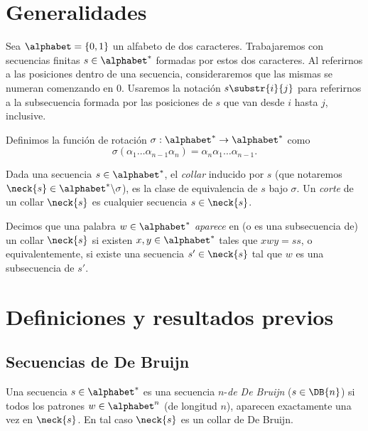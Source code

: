 
\newcommand{\note}[1]{\textbf{\textcolor{red}{#1}}}


\section{Generalidades}

Sea $\alphabet = \lbrace0, 1\rbrace$ un alfabeto de dos caracteres.
Trabajaremos con secuencias finitas $s \in \alphabet^*$ formadas por estos dos
caracteres. Al referirnos a las posiciones dentro de una secuencia,
consideraremos que las mismas se numeran comenzando en $0$. Usaremos la
notación $s\substr{i}{j}$ para referirnos a la subsecuencia formada por las
posiciones de $s$ que van desde $i$ hasta $j$, inclusive.

\begin{defi}
  Definimos la función de rotación $\sigma: \alphabet^* \to \alphabet^*$ como
  \[ \sigma(\alpha_1\dots\alpha_{n-1}\alpha_n) =
    \alpha_n\alpha_1\dots\alpha_{n-1}. \]
\end{defi}

\begin{defi}
  Dada una secuencia $s \in \alphabet^*$, el \emph{collar} inducido por $s$
  (que notaremos $\neck{s} \in \alphabet^*\backslash\sigma$), es la clase de
  equivalencia de $s$ bajo $\sigma$. Un \emph{corte} de un collar $\neck{s}$
  es cualquier secuencia $s \in \neck{s}$.
\end{defi}

\begin{defi}

  Decimos que una palabra $w \in \alphabet^*$ \emph{aparece} en (o es una
  subsecuencia de) un collar $\neck{s}$ si existen $x, y \in \alphabet^*$ tales
  que $xwy = ss$, o equivalentemente, si existe una secuencia $s' \in \neck{s}$
  tal que $w$ es una subsecuencia de $s'$.
\end{defi}

\section{Definiciones y resultados previos}

\subsection{Secuencias de De Bruijn}

\begin{defi}
  Una secuencia $s \in \alphabet^*$ es una secuencia $n$-\emph{de De Bruijn}
  ($s \in \DB{n}$) si todos los patrones $w \in \alphabet^n$ (de longitud $n$),
  aparecen exactamente una vez en $\neck{s}$. En tal caso $\neck{s}$ es un
  collar de De Bruijn.
\end{defi}

